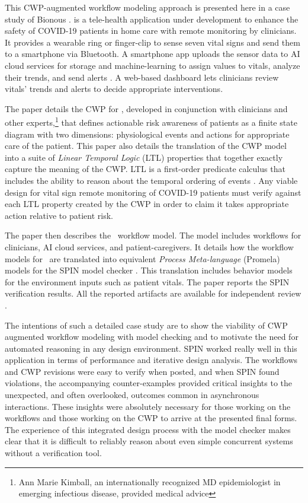 This CWP-augmented workflow modeling approach is presented here in a case study of Bionous \phware. \phware is a tele-health application under development to enhance the safety of COVID-19 patients in home care with remote monitoring by clinicians. It provides a wearable ring or finger-clip to sense seven vital signs and send them to a smartphone via Bluetooth. A smartphone app uploads the sensor data to AI cloud services for storage and machine-learning to assign values to vitals, analyze their trends, and send alerts \cite{Altschul2004PredictiveMI,10.2307/2984877,10.5555/1643031.1643047}. A web-based dashboard lets clinicians review vitals' trends and alerts to decide appropriate interventions.

The paper details the CWP for \phware, developed in conjunction with clinicians and other experts,\footnote{Ann Marie Kimball, an internationally recognized MD epidemiologist in emerging infectious disease, provided medical advice} that defines actionable risk awareness of patients as a finite state diagram with two dimensions: physiological events and actions for appropriate care of the patient. This paper also details the translation of the CWP model into a suite of \emph{Linear Temporal Logic} (LTL) properties that together exactly capture the meaning of the CWP. LTL is a first-order predicate calculus that includes the ability to reason about the temporal ordering of events \cite{10.5555/975331}. Any viable design for vital sign remote monitoring of COVID-19 patients must verify against each LTL property created by the CWP in order to claim it takes appropriate action relative to patient risk.

The paper then describes the \phware\ workflow model. The model includes workflows for clinicians, AI cloud services, and patient-caregivers. It details how the workflow models for \phware\ are translated into equivalent \emph{Process Meta-language} (Promela) models for the SPIN model checker \cite{spin}. This translation includes behavior models for the environment inputs such as patient vitals. The paper reports the SPIN verification results. All the reported artifacts are available for independent review \cite{repo}.

The intentions of such a detailed case study are to show the viability of CWP augmented workflow modeling with model checking and to motivate the need for automated reasoning in any design environment. SPIN worked really well in this application in terms of performance and iterative design analysis. The workflows and CWP revisions were easy to verify when posted, and when SPIN found violations, the accompanying counter-examples provided critical insights to the unexpected, and often overlooked, outcomes common in asynchronous interactions. These insights were absolutely necessary for those working on the workflows and those working on the CWP to arrive at the presented final forms. The experience of this integrated design process with the model checker makes clear that it is difficult to reliably reason about even simple concurrent systems without a verification tool.